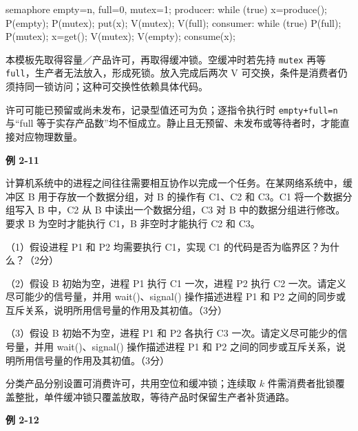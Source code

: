 \par\smallskip\noindent\begin{minipage}{\linewidth}
\begin{codeblock}[language={}]
semaphore empty=n, full=0, mutex=1;
producer: while (true) {
    x=produce();
    P(empty); P(mutex);
    put(x);
    V(mutex); V(full);
}
consumer: while (true) {
    P(full); P(mutex);
    x=get();
    V(mutex); V(empty);
    consume(x);
}
\end{codeblock}
\end{minipage}\par\smallskip

本模板先取得容量／产品许可，再取得缓冲锁。空缓冲时若先持 \texttt{mutex} 再等 \texttt{full}，生产者无法放入，形成死锁。放入完成后两次 V 可交换，条件是消费者仍须持同一锁访问；这种可交换性依赖具体代码。

许可可能已预留或尚未发布，记录型值还可为负；逐指令执行时 \texttt{empty+\allowbreak{}full=\allowbreak{}n} 与``full 等于实存产品数''均不恒成立。静止且无预留、未发布或等待者时，才能直接对应物理数量。

\par\medskip{}\noindent\hypertarget{OS02-E11}{}\label{OS02-E11}\textbf{例 2-11}\par\nobreak\smallskip

计算机系统中的进程之间往往需要相互协作以完成一个任务。在某网络系统中，缓冲区 B 用于存放一个数据分组，对 B 的操作有 C1、C2 和 C3。C1 将一个数据分组写入 B 中，C2 从 B 中读出一个数据分组，C3 对 B 中的数据分组进行修改。要求 B 为空时才能执行 C1，B 非空时才能执行 C2 和 C3。

（1）假设进程 P1 和 P2 均需要执行 C1，实现 C1 的代码是否为临界区？为什么？（2分）

（2）假设 B 初始为空，进程 P1 执行 C1 一次，进程 P2 执行 C2 一次。请定义尽可能少的信号量，并用 wait()、signal() 操作描述进程 P1 和 P2 之间的同步或互斥关系，说明所用信号量的作用及其初值。（3分）

（3）假设 B 初始不为空，进程 P1 和 P2 各执行 C3 一次。请定义尽可能少的信号量，并用 wait()、signal() 操作描述进程 P1 和 P2 之间的同步或互斥关系，说明所用信号量的作用及其初值。（3分）

分类产品分别设置可消费许可，共用空位和缓冲锁；连续取 \(k\) 件需消费者批锁覆盖整批，单件缓冲锁只覆盖放取，等待产品时保留生产者补货通路。

\par\medskip{}\noindent\hypertarget{OS02-E12}{}\label{OS02-E12}\textbf{例 2-12}\par\nobreak\smallskip

